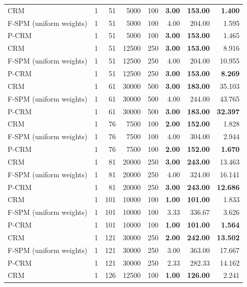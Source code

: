 \begin{tabular}{lrrrrrrr}
\midrule
CRM & 1 & 51 & 5000 & 100 & \textbf{3.00} & \textbf{153.00} & \textbf{1.400} \\
F-SPM (uniform weights) & 1 & 51 & 5000 & 100 & 4.00 & 204.00 & 1.595 \\
P-CRM & 1 & 51 & 5000 & 100 & \textbf{3.00} & \textbf{153.00} & 1.465 \\
\midrule
CRM & 1 & 51 & 12500 & 250 & \textbf{3.00} & \textbf{153.00} & 8.916 \\
F-SPM (uniform weights) & 1 & 51 & 12500 & 250 & 4.00 & 204.00 & 10.955 \\
P-CRM & 1 & 51 & 12500 & 250 & \textbf{3.00} & \textbf{153.00} & \textbf{8.269} \\
\midrule
CRM & 1 & 61 & 30000 & 500 & \textbf{3.00} & \textbf{183.00} & 35.103 \\
F-SPM (uniform weights) & 1 & 61 & 30000 & 500 & 4.00 & 244.00 & 43.765 \\
P-CRM & 1 & 61 & 30000 & 500 & \textbf{3.00} & \textbf{183.00} & \textbf{32.397} \\
\midrule
CRM & 1 & 76 & 7500 & 100 & \textbf{2.00} & \textbf{152.00} & 1.828 \\
F-SPM (uniform weights) & 1 & 76 & 7500 & 100 & 4.00 & 304.00 & 2.944 \\
P-CRM & 1 & 76 & 7500 & 100 & \textbf{2.00} & \textbf{152.00} & \textbf{1.670} \\
\midrule
CRM & 1 & 81 & 20000 & 250 & \textbf{3.00} & \textbf{243.00} & 13.463 \\
F-SPM (uniform weights) & 1 & 81 & 20000 & 250 & 4.00 & 324.00 & 16.141 \\
P-CRM & 1 & 81 & 20000 & 250 & \textbf{3.00} & \textbf{243.00} & \textbf{12.686} \\
\midrule
CRM & 1 & 101 & 10000 & 100 & \textbf{1.00} & \textbf{101.00} & 1.833 \\
F-SPM (uniform weights) & 1 & 101 & 10000 & 100 & 3.33 & 336.67 & 3.626 \\
P-CRM & 1 & 101 & 10000 & 100 & \textbf{1.00} & \textbf{101.00} & \textbf{1.564} \\
\midrule
CRM & 1 & 121 & 30000 & 250 & \textbf{2.00} & \textbf{242.00} & \textbf{13.502} \\
F-SPM (uniform weights) & 1 & 121 & 30000 & 250 & 3.00 & 363.00 & 17.667 \\
P-CRM & 1 & 121 & 30000 & 250 & 2.33 & 282.33 & 14.162 \\
\midrule
CRM & 1 & 126 & 12500 & 100 & \textbf{1.00} & \textbf{126.00} & 2.241 \\

\end{tabular}
